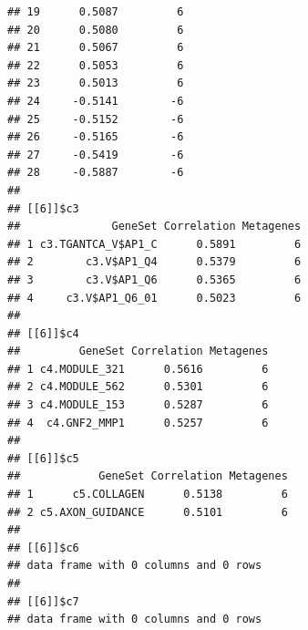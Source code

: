 \documentclass{article}\usepackage[]{graphicx}\usepackage[]{color}
\makeatletter
\newenvironment{kframe}{%
 \def\at@end@of@kframe{}%
 \ifinner\ifhmode%
  \def\at@end@of@kframe{\end{minipage}}%
  \begin{minipage}{\columnwidth}%
 \fi\fi%
 \def\FrameCommand##1{\hskip\@totalleftmargin \hskip-\fboxsep
 \colorbox{shadecolor}{##1}\hskip-\fboxsep
     \hskip-\linewidth \hskip-\@totalleftmargin \hskip\columnwidth}%
 \MakeFramed {\advance\hsize-\width
   \@totalleftmargin\z@ \linewidth\hsize
   \@setminipage}}%
 {\par\unskip\endMakeFramed%
 \at@end@of@kframe}
\newenvironment{knitrout}{}{} %
\makeatother
\begin{document}
\begin{knitrout}
\begin{kframe}
\begin{verbatim}
## 19      0.5087         6
## 20      0.5080         6
## 21      0.5067         6
## 22      0.5053         6
## 23      0.5013         6
## 24     -0.5141        -6
## 25     -0.5152        -6
## 26     -0.5165        -6
## 27     -0.5419        -6
## 28     -0.5887        -6
## 
## [[6]]$c3
##              GeneSet Correlation Metagenes
## 1 c3.TGANTCA_V$AP1_C      0.5891         6
## 2        c3.V$AP1_Q4      0.5379         6
## 3        c3.V$AP1_Q6      0.5365         6
## 4     c3.V$AP1_Q6_01      0.5023         6
## 
## [[6]]$c4
##         GeneSet Correlation Metagenes
## 1 c4.MODULE_321      0.5616         6
## 2 c4.MODULE_562      0.5301         6
## 3 c4.MODULE_153      0.5287         6
## 4  c4.GNF2_MMP1      0.5257         6
## 
## [[6]]$c5
##            GeneSet Correlation Metagenes
## 1      c5.COLLAGEN      0.5138         6
## 2 c5.AXON_GUIDANCE      0.5101         6
## 
## [[6]]$c6
## data frame with 0 columns and 0 rows
## 
## [[6]]$c7
## data frame with 0 columns and 0 rows
\end{verbatim}
\end{kframe}
\end{knitrout}


\end{document}
